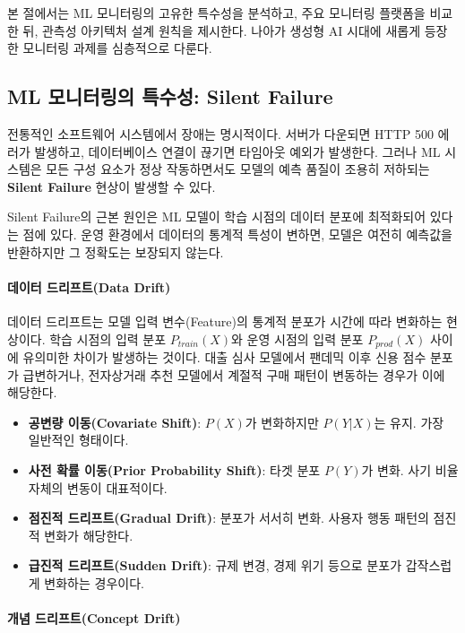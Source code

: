 본 절에서는 ML 모니터링의 고유한 특수성을 분석하고, 주요 모니터링 플랫폼을 비교한 뒤, 관측성 아키텍처 설계 원칙을 제시한다. 나아가 생성형 AI 시대에 새롭게 등장한 모니터링 과제를 심층적으로 다룬다.

\subsection{ML 모니터링의 특수성: Silent Failure}
\label{sec:14.3.1}

전통적인 소프트웨어 시스템에서 장애는 명시적이다. 서버가 다운되면 HTTP 500 에러가 발생하고, 데이터베이스 연결이 끊기면 타임아웃 예외가 발생한다. 그러나 ML 시스템은 모든 구성 요소가 정상 작동하면서도 모델의 예측 품질이 조용히 저하되는 \textbf{Silent Failure} 현상이 발생할 수 있다.

Silent Failure의 근본 원인은 ML 모델이 학습 시점의 데이터 분포에 최적화되어 있다는 점에 있다. 운영 환경에서 데이터의 통계적 특성이 변하면, 모델은 여전히 예측값을 반환하지만 그 정확도는 보장되지 않는다.

\paragraph{데이터 드리프트(Data Drift)}

데이터 드리프트는 모델 입력 변수(Feature)의 통계적 분포가 시간에 따라 변화하는 현상이다. 학습 시점의 입력 분포 $P_{train}(X)$와 운영 시점의 입력 분포 $P_{prod}(X)$ 사이에 유의미한 차이가 발생하는 것이다. 대출 심사 모델에서 팬데믹 이후 신용 점수 분포가 급변하거나, 전자상거래 추천 모델에서 계절적 구매 패턴이 변동하는 경우가 이에 해당한다.

\begin{itemize}
    \item \textbf{공변량 이동(Covariate Shift)}: $P(X)$가 변화하지만 $P(Y|X)$는 유지. 가장 일반적인 형태이다.
    \item \textbf{사전 확률 이동(Prior Probability Shift)}: 타겟 분포 $P(Y)$가 변화. 사기 비율 자체의 변동이 대표적이다.
    \item \textbf{점진적 드리프트(Gradual Drift)}: 분포가 서서히 변화. 사용자 행동 패턴의 점진적 변화가 해당한다.
    \item \textbf{급진적 드리프트(Sudden Drift)}: 규제 변경, 경제 위기 등으로 분포가 갑작스럽게 변화하는 경우이다.
\end{itemize}

\paragraph{개념 드리프트(Concept Drift)}

